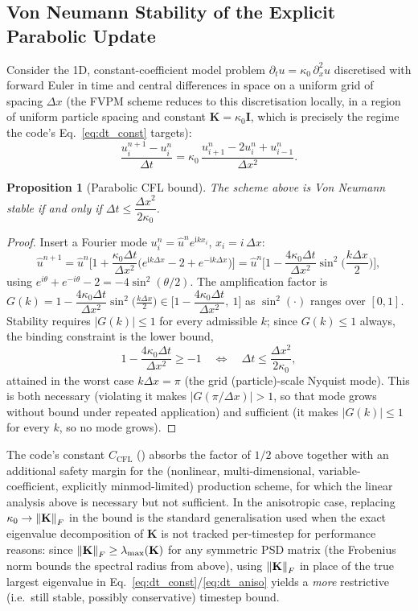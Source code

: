 \documentclass[11pt, a4paper, parskip]{scrartcl}
\newcommand{\code}[1]{\texttt{\seqsplit{#1}}}
\theoremstyle{plain}
\newtheorem{proposition}{Proposition}
\theoremstyle{definition}
\newcommand{\Kmat}{\mathbf{K}}                            %
\newcommand{\kappaC}{\kappa_{0}}                          %
\newcommand{\CCFL}{C_{\mathrm{CFL}}}                      %
\newcommand{\dx}{\Delta x}                                %
\newcommand{\dt}{\Delta t}                                %
\begin{document}
\subsection{Von Neumann Stability of the Explicit Parabolic Update}
\label{app:von-neumann}
Consider the 1D, constant-coefficient model problem
$\partial_t u = \kappaC\,\partial_x^2 u$ discretised with forward Euler
in time and central differences in space on a uniform grid of spacing
$\dx$ (the FVPM scheme reduces to this discretisation locally, in a
region of uniform particle spacing and constant $\Kmat=\kappaC\mathbf I$,
which is precisely the regime the code's
Eq.~\eqref{eq:dt_const} targets):
\begin{equation}
  \frac{u_i^{n+1}-u_i^n}{\dt} = \kappaC\,\frac{u_{i+1}^n - 2u_i^n + u_{i-1}^n}{\dx^2} .
\end{equation}
\begin{proposition}[Parabolic CFL bound]
The scheme above is Von Neumann stable if and only if
$\dt \le \dfrac{\dx^2}{2\kappaC}$.
\end{proposition}
\begin{proof}
Insert a Fourier mode $u_i^n = \hat u^n e^{\mathrm i k x_i}$, $x_i = i\,\dx$:
\begin{equation}
  \hat u^{n+1} = \hat u^n\Big[1 + \frac{\kappaC\dt}{\dx^2}\big(e^{\mathrm i k\dx} - 2 + e^{-\mathrm i k\dx}\big)\Big]
  = \hat u^n\Big[1 - \frac{4\kappaC\dt}{\dx^2}\sin^2\!\Big(\frac{k\dx}{2}\Big)\Big] ,
\end{equation}
using $e^{i\theta}+e^{-i\theta}-2 = -4\sin^2(\theta/2)$. The amplification
factor is
$G(k) = 1 - \dfrac{4\kappaC\dt}{\dx^2}\sin^2\!\big(\tfrac{k\dx}{2}\big) \in
\Big[1-\dfrac{4\kappaC\dt}{\dx^2},\ 1\Big]$
as $\sin^2(\cdot)$ ranges over $[0,1]$. Stability requires
$|G(k)|\le 1$ for every admissible $k$; since $G(k)\le1$ always, the
binding constraint is the lower bound,
\begin{equation}
  1 - \frac{4\kappaC\dt}{\dx^2} \ge -1
  \quad\Longleftrightarrow\quad
  \dt \le \frac{\dx^2}{2\kappaC} ,
\end{equation}
attained in the worst case $k\dx=\pi$ (the grid (particle)-scale
Nyquist mode). This is both necessary (violating it makes $|G(\pi/\dx)|>1$,
so that mode grows without bound under repeated application) and
sufficient (it makes $|G(k)|\le1$ for every $k$, so no mode grows).
\end{proof}
The code's constant $\CCFL$ (\code{chem\_data->C\_CFL\_chemistry}) absorbs
the factor of $1/2$ above together with an additional safety margin for
the (nonlinear, multi-dimensional, variable-coefficient, explicitly
minmod-limited) production scheme, for which the linear analysis above
is necessary but not sufficient. In the anisotropic case, replacing
$\kappaC \to \norm{\Kmat}_F$ in the bound is the standard generalisation
used when the exact eigenvalue decomposition of $\Kmat$ is not tracked
per-timestep for performance reasons: since
$\norm{\Kmat}_F \ge \lambda_{\max}(\Kmat)$ for any symmetric PSD matrix
(the Frobenius norm bounds the spectral radius from above), using
$\norm{\Kmat}_F$ in place of the true largest eigenvalue in
Eq.~\eqref{eq:dt_const}/\eqref{eq:dt_aniso} yields a \emph{more}
restrictive (i.e.\ still stable, possibly conservative) timestep bound.
\end{document}
